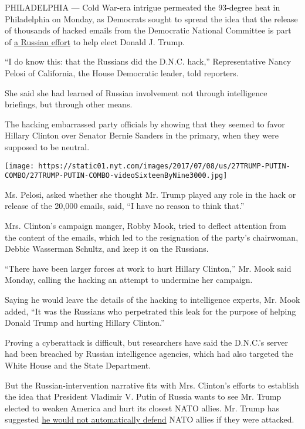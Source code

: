 PHILADELPHIA --- Cold War-era intrigue permeated the 93-degree heat in
Philadelphia on Monday, as Democrats sought to spread the idea that the
release of thousands of hacked emails from the Democratic National
Committee is part of
\href{http://www.nytimes.com/2016/07/25/us/politics/donald-trump-russia-emails.html}{a
Russian effort} to help elect Donald J. Trump.

``I do know this: that the Russians did the D.N.C. hack,''
Representative Nancy Pelosi of California, the House Democratic leader,
told reporters.

She said she had learned of Russian involvement not through intelligence
briefings, but through other means.

The hacking embarrassed party officials by showing that they seemed to
favor Hillary Clinton over Senator Bernie Sanders in the primary, when
they were supposed to be neutral.

\texttt{[image: https://static01.nyt.com/images/2017/07/08/us/27TRUMP-PUTIN-COMBO/27TRUMP-PUTIN-COMBO-videoSixteenByNine3000.jpg]}

Ms. Pelosi, asked whether she thought Mr. Trump played any role in the
hack or release of the 20,000 emails, said, ``I have no reason to think
that.''

Mrs. Clinton's campaign manger, Robby Mook, tried to deflect attention
from the content of the emails, which led to the resignation of the
party's chairwoman, Debbie Wasserman Schultz, and keep it on the
Russians.

``There have been larger forces at work to hurt Hillary Clinton,'' Mr.
Mook said Monday, calling the hacking an attempt to undermine her
campaign.

Saying he would leave the details of the hacking to intelligence
experts, Mr. Mook added, ``It was the Russians who perpetrated this leak
for the purpose of helping Donald Trump and hurting Hillary Clinton.''

Proving a cyberattack is difficult, but researchers have said the
D.N.C.'s server had been breached by Russian intelligence agencies,
which had also targeted the White House and the State Department.

But the Russian-intervention narrative fits with Mrs. Clinton's efforts
to establish the idea that President Vladimir V. Putin of Russia wants
to see Mr. Trump elected to weaken America and hurt its closest NATO
allies. Mr. Trump has suggested
\href{http://www.nytimes.com/2016/07/21/us/politics/donald-trump-issues.html}{he
would not automatically defend} NATO allies if they were attacked.

